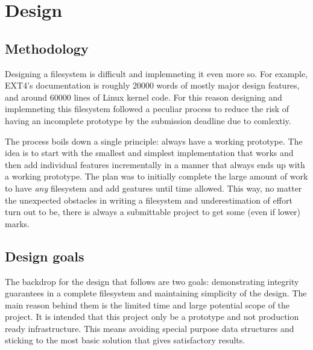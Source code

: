 \chapter{Design}

    \section{Methodology}
        \label{sec_methodology}

        Designing a filesystem is difficult and implemneting it even more so.
        For example, EXT4's documentation
        \cite{https://www.kernel.org/doc/html/latest/filesystems/ext4/index.html}
        is roughly 20000 words of mostly major design features, and around
        60000 lines of Linux kernel code. For this reason designing and
        implemneting this filesystem followed a peculiar process to reduce the
        risk of having an incomplete prototype by the submission deadline due
        to comlextiy.

        The process boils down a single principle: always have a working
        prototype. The idea is to start with the smallest and simplest
        implementation that works and then add individual features
        incrementally in a manner that always ends up with a working prototype.
        The plan was to initially complete the large amount of work to have
        \textit{any} filesystem and add geatures until time allowed. This way,
        no matter the unexpected obstacles in writing a filesystem and
        underestimation of effort turn out to be, there is always a submittable
        project to get some (even if lower) marks.


    \section{Design goals}

        The backdrop for the design that follows are two goals: demonstrating
        integrity guarantees in a complete filesystem and maintaining
        simplicity of the design. The main reason behind them is the limited
        time and large potential scope of the project. It is intended that this
        project only be a prototype and not production ready infrastructure.
        This means avoiding special purpose data structures and sticking to the
        most basic solution that gives satisfactory results.

